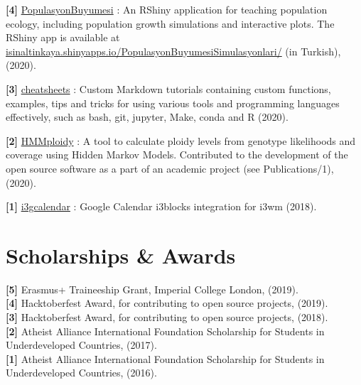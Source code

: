 \documentclass[letterpaper,10.5pt]{article}
\begin{document}
\textbf{[4]} \hspace{0.42cm} \href{https://github.com/isinaltinkaya/PopulasyonBuyumesi}{PopulasyonBuyumesi} : An RShiny application for teaching population ecology, including population growth simulations and interactive plots. The RShiny app is available at \href{https://isinaltinkaya.shinyapps.io/PopulasyonBuyumesiSimulasyonlari/}{isinaltinkaya.shinyapps.io/PopulasyonBuyumesiSimulasyonlari/} (in Turkish), (2020).\\
\smallskip

\textbf{[3]} \hspace{0.42cm} \href{https://github.com/isinaltinkaya/cheatsheets}{cheatsheets} : Custom Markdown tutorials containing custom functions, examples, tips and tricks for using various tools and programming languages effectively, such as bash, git, jupyter, Make, conda and R (2020). \\
\smallskip

\textbf{[2]} \hspace{0.42cm} \href{https://github.com/SamueleSoraggi/HMMploidy}{HMMploidy} : A tool to calculate ploidy levels from genotype likelihoods and coverage using Hidden Markov Models. Contributed to the development of the open source software as a part of an academic project (see Publications/1), (2020).\\
\smallskip

\textbf{[1]} \hspace{0.42cm} \href{https://github.com/isinaltinkaya/i3gcalendar}{i3gcalendar} : Google Calendar i3blocks integration for i3wm (2018). \\
\smallskip


\section{Scholarships \& Awards}
\textbf{[5]} \hspace{0.42cm} Erasmus+ Traineeship Grant, Imperial College London, (2019). \\
\textbf{[4]} \hspace{0.42cm} Hacktoberfest Award, for contributing to open source projects, (2019). \\
\textbf{[3]} \hspace{0.42cm} Hacktoberfest Award, for contributing to open source projects, (2018). \\
\textbf{[2]} \hspace{0.42cm} Atheist Alliance International Foundation Scholarship for Students in Underdeveloped Countries, (2017). \\
\textbf{[1]} \hspace{0.42cm} Atheist Alliance International Foundation Scholarship for Students in Underdeveloped Countries, (2016). \\
\end{document}

